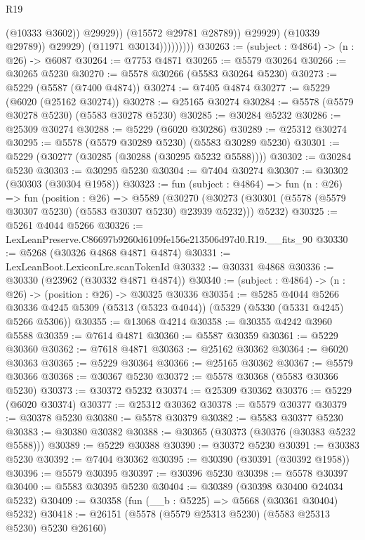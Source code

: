 \begin{lexlean}{R19}
\begin{coremodule}
                                  (@10333 @3602))
                                @29929))
                            (@15572 @29781 @28789))
                          @29929)
                        (@10339 @29789))
                      @29929)
                    (@11971 @30134)))))))))
@30263 := (subject : @4864) -> (n : @26) -> @6087
@30264 := @7753 @4871
@30265 := @5579 @30264
@30266 := @30265 @5230
@30270 := @5578 @30266 (@5583 @30264 @5230)
@30273 := @5229 (@5587 (@7400 @4874))
@30274 := @7405 @4874
@30277 := @5229 (@6020 (@25162 @30274))
@30278 := @25165 @30274
@30284 := @5578 (@5579 @30278 @5230) (@5583 @30278 @5230)
@30285 := @30284 @5232
@30286 := @25309 @30274
@30288 := @5229 (@6020 @30286)
@30289 := @25312 @30274
@30295 := @5578 (@5579 @30289 @5230) (@5583 @30289 @5230)
@30301 := @5229 (@30277 (@30285 (@30288 (@30295 @5232 @5588))))
@30302 := @30284 @5230
@30303 := @30295 @5230
@30304 := @7404 @30274
@30307 := @30302 (@30303 (@30304 @1958))
@30323 := fun (subject : @4864) =>
  fun (n : @26) =>
  fun (position : @26) =>
  @5589
    (@30270 (@30273 (@30301 (@5578 (@5579 @30307 @5230) (@5583 @30307 @5230) @23939 @5232))) @5232)
@30325 := @5261 @4044 @5266
@30326 := LexLeanPreserve.C86697b9260d6109fe156e213506d97d0.R19.__fits_90
@30330 := @5268 (@30326 @4868 @4871 @4874)
@30331 := LexLeanBoot.LexiconLre.scanTokenId
@30332 := @30331 @4868
@30336 := @30330 (@23962 (@30332 @4871 @4874))
@30340 := (subject : @4864) -> (n : @26) -> (position : @26) -> @30325 @30336
@30354 := @5285
    @4044
    @5266
    @30336
    @4245
    @5309
    (@5313 (@5323 @4044))
    (@5329 (@5330 (@5331 @4245) @5266 @5306))
@30355 := @13068 @4214
@30358 := @30355 @4242 @3960 @5588
@30359 := @7614 @4871
@30360 := @5587 @30359
@30361 := @5229 @30360
@30362 := @7618 @4871
@30363 := @25162 @30362
@30364 := @6020 @30363
@30365 := @5229 @30364
@30366 := @25165 @30362
@30367 := @5579 @30366
@30368 := @30367 @5230
@30372 := @5578 @30368 (@5583 @30366 @5230)
@30373 := @30372 @5232
@30374 := @25309 @30362
@30376 := @5229 (@6020 @30374)
@30377 := @25312 @30362
@30378 := @5579 @30377
@30379 := @30378 @5230
@30380 := @5578 @30379
@30382 := @5583 @30377 @5230
@30383 := @30380 @30382
@30388 := @30365 (@30373 (@30376 (@30383 @5232 @5588)))
@30389 := @5229 @30388
@30390 := @30372 @5230
@30391 := @30383 @5230
@30392 := @7404 @30362
@30395 := @30390 (@30391 (@30392 @1958))
@30396 := @5579 @30395
@30397 := @30396 @5230
@30398 := @5578 @30397
@30400 := @5583 @30395 @5230
@30404 := @30389 (@30398 @30400 @24034 @5232)
@30409 := @30358 (fun (__b : @5225) => @5668 (@30361 @30404) @5232)
@30418 := @26151 (@5578 (@5579 @25313 @5230) (@5583 @25313 @5230) @5230 @26160)

\end{coremodule}
\end{lexlean}
